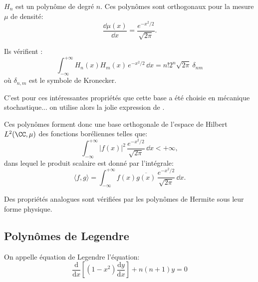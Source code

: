 \medskip
$H_n$ est un polynôme de degré $n$. 
Ces polynômes sont orthogonaux pour la mesure $\mu$ de densité:
\begin{equation}
    \frac{\dd\mu(x)}{\dd x} = \frac{e^{-x^2/2}}{\sqrt{2\pi}}.
\end{equation}

Ils vérifient :
\begin{equation}
    \int_{-\infty}^{+\infty} H_n(x)H_m(x)\,e^{-x^2/2}\,\dd x=n!2^n\sqrt{2\pi}~\delta_{nm}
\end{equation}
où $\delta_{n,m}$ est le symbole de Kronecker.

C'est pour ces intéressantes propriétés que cette base a été choisie en mécanique stochastique... 
on utilise alors la jolie expression de .

\medskip
Ces polynômes forment donc une base orthogonale de l'espace de Hilbert 
$L^2(\CC,\mu)$ des fonctions boréliennes telles que:
\begin{equation}
    \int_{-\infty}^{+\infty}|f(x)|^2\,\frac{e^{-x^2/2}}{\sqrt{2\pi}}\,\dd x< +\infty,
\end{equation}
dans lequel le produit scalaire est donné par l'intégrale:
\begin{equation}
    \langle f,g\rangle=\int_{-\infty}^{+\infty} f(x)\overline{g(x)}\,\frac{e^{-x^2/2}}{\sqrt{2\pi}}\,\dd x.
\end{equation}

Des propriétés analogues sont vérifiées par les polynômes de Hermite 
sous leur forme physique.





\medskip
\subsection{Polynômes de Legendre}

On appelle équation de Legendre l'équation:
\begin{equation}\frac{\textrm{d}}{\textrm{d}x}[(1-x^{2})\frac{\textrm{d}y}{\textrm{d}x}]+n(n+1)y=0\end{equation}

